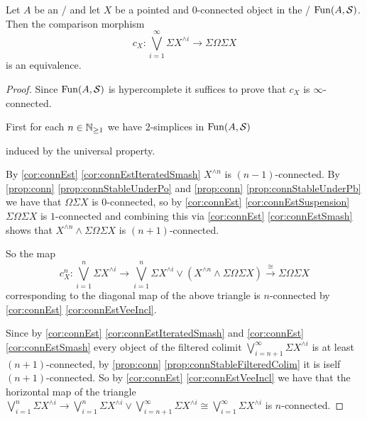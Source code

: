 \begin{prop}\label{prop:jamesSplittingPresheaf} %
    Let $A$ be an \inftycat/ and let $X$ be a pointed and $0$-connected object in the \inftytop/ $\operatorname{Fun}(A,\mathcal{S})$. %
    Then the comparison morphism 
    \begin{equation*}
        c_X\colon\bigvee\limits_{i=1}^{\infty}\Sigma X^{\wedge i}\to\Sigma\Omega\Sigma X
    \end{equation*}
    is an equivalence. 
    \begin{proof}
        Since $\operatorname{Fun}(A,\mathcal{S})$ is hypercomplete %
        it suffices to prove that $c_X$ is $\infty$-connected.

        First for each $n\in\mathbb{N}_{\geq 1}$ we have $2$-simplices in $\operatorname{Fun}(A,\mathcal{S})$
        \begin{center}
        \end{center}
        induced by the universal property.

        By \cref{cor:connEst} \ref{cor:connEstIteratedSmash} $X^{\wedge n}$ is $(n-1)$-connected.
        By \cref{prop:conn} \ref{prop:connStableUnderPo} and \cref{prop:conn} \ref{prop:connStableUnderPb} we have that $\Omega\Sigma X$ is $0$-connected, so by \cref{cor:connEst} \ref{cor:connEstSuspension} $\Sigma\Omega\Sigma X$ is $1$-connected and combining this via \cref{cor:connEst} \ref{cor:connEstSmash} shows that $X^{\wedge n}\wedge\Sigma\Omega\Sigma X$ is $(n+1)$-connected.

        So the map 
        \begin{equation*}
            c_X^n\colon\bigvee\limits_{i=1}^n\Sigma X^{\wedge i}\to\bigvee\limits_{i=1}^n\Sigma X^{\wedge i}\vee\left(X^{\wedge n}\wedge\Sigma\Omega\Sigma X\right)\xrightarrow{\cong}\Sigma\Omega\Sigma X
        \end{equation*}
        corresponding to the diagonal map of the above triangle is $n$-connected by \cref{cor:connEst} \ref{cor:connEstVeeIncl}.

        Since by \cref{cor:connEst} \ref{cor:connEstIteratedSmash} and \cref{cor:connEst} \ref{cor:connEstSmash} every object of the filtered colimit $\bigvee\limits_{i=n+1}^{\infty}\Sigma X^{\wedge i}$ is at least $(n+1)$-connected, by \cref{prop:conn} \ref{prop:connStableFilteredColim} it is iself $(n+1)$-connected.
        So by \cref{cor:connEst} \ref{cor:connEstVeeIncl} we have that the horizontal map of the triangle $\bigvee\limits_{i=1}^n\Sigma X^{\wedge i}\to\bigvee\limits_{i=1}^n\Sigma X^{\wedge i}\vee\bigvee\limits_{i=n+1}^{\infty}\Sigma X^{\wedge i}\cong\bigvee\limits_{i=1}^{\infty}\Sigma X^{\wedge i}$ is $n$-connected.


\end{proof}
\end{prop}
